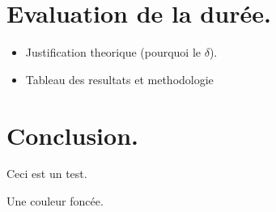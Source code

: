 \documentclass{article}
\begin{document}
\section{Evaluation de la durée.}
\begin{itemize}
\item Justification theorique (pourquoi le $\delta$).
\item Tableau des resultats et methodologie
\end{itemize}

\section{Conclusion.}

Ceci est un test.

Une couleur foncée.
\end{document}

